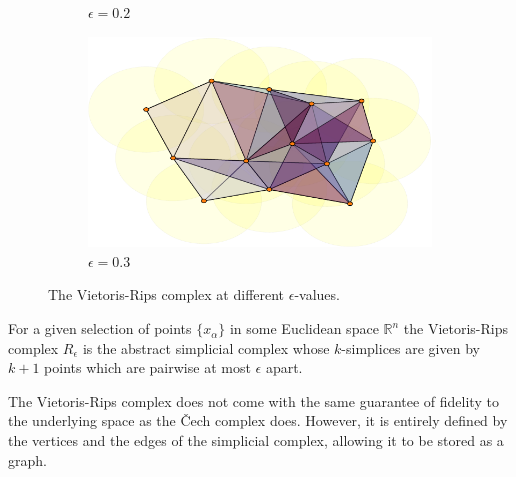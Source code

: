 \begin{figure}
\begin{subfigure}[b]{.49\linewidth}
    \caption{$\epsilon=0.2$}
 \end{subfigure}
  \begin{subfigure}[b]{.5\linewidth}
    \includegraphics[scale=.5]{rips_eps=03.pdf}
    \caption{$\epsilon=0.3$}
 \end{subfigure}
 \caption{The Vietoris-Rips complex at different $\epsilon$-values.}
 \label{manyrips}
\end{figure}
\begin{definition}
For a given selection of points $\{x_{\alpha}\}$ in some Euclidean space $\mathbb{R}^{n}$ the Vietoris-Rips complex $R_{\epsilon}$ is the abstract simplicial complex whose $k$-simplices are given by $k+1$ points which are pairwise at most $\epsilon$ apart.
\end{definition}

The Vietoris-Rips complex does not come with the same guarantee of fidelity to the underlying space as the Čech complex does. However, it is entirely defined by the vertices and the edges of the simplicial complex, allowing it to be stored as a graph.

